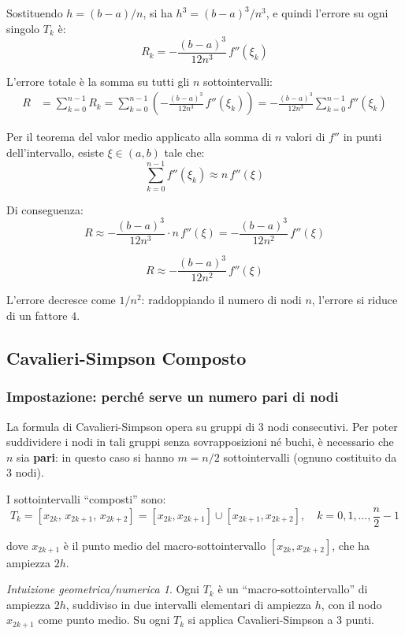 \documentclass[a4paper,12pt]{article}
\theoremstyle{definition}
\theoremstyle{remark}
\newtheorem*{intuizione}{Intuizione geometrica/numerica}
\begin{document}
\noindent Sostituendo $h = (b-a)/n$, si ha $h^3 = (b-a)^3/n^3$, e quindi
l'errore su ogni singolo $T_k$ è:
\[
  R_k = -\frac{(b-a)^3}{12n^3}\,f''(\xi_k)
\]

L'errore totale è la somma su tutti gli $n$ sottointervalli:
\begin{align*}
  R &= \sum_{k=0}^{n-1} R_k
     = \sum_{k=0}^{n-1} \left(-\frac{(b-a)^3}{12n^3}\,f''(\xi_k)\right)
     = -\frac{(b-a)^3}{12n^3}\sum_{k=0}^{n-1} f''(\xi_k)
\end{align*}

\noindent Per il teorema del valor medio applicato alla somma di $n$
valori di $f''$ in punti dell'intervallo, esiste $\xi \in (a,b)$ tale che:
\[
  \sum_{k=0}^{n-1} f''(\xi_k) \approx n\,f''(\xi)
\]

\noindent Di conseguenza:
\[
  R \approx -\frac{(b-a)^3}{12n^3} \cdot n\,f''(\xi) = -\frac{(b-a)^3}{12n^2}\,f''(\xi)
\]

\begin{equation}
  \boxed{R \approx -\frac{(b-a)^3}{12n^2}\,f''(\xi)}
  \label{eq:errore-trap-comp}
\end{equation}

\noindent L'errore decresce come $1/n^2$: raddoppiando il numero di nodi
$n$, l'errore si riduce di un fattore $4$.

\subsection{Cavalieri-Simpson Composto}

\subsubsection*{Impostazione: perché serve un numero pari di nodi}

La formula di Cavalieri-Simpson opera su gruppi di 3 nodi consecutivi.
Per poter suddividere i nodi in tali gruppi senza sovrapposizioni né
buchi, è necessario che $n$ sia \textbf{pari}: in questo caso si hanno
$m = n/2$ sottointervalli (ognuno costituito da 3 nodi).

I sottointervalli ``composti'' sono:
\[
  T_k = [x_{2k},\, x_{2k+1},\, x_{2k+2}]
      = [x_{2k},x_{2k+1}] \cup [x_{2k+1},x_{2k+2}],
      \quad k = 0, 1, \ldots, \frac{n}{2}-1
\]

\noindent dove $x_{2k+1}$ è il punto medio del macro-sottointervallo
$[x_{2k},x_{2k+2}]$, che ha ampiezza $2h$.

\begin{intuizione}
Ogni $T_k$ è un ``macro-sottointervallo'' di ampiezza $2h$, suddiviso
in due intervalli elementari di ampiezza $h$, con il nodo $x_{2k+1}$
come punto medio. Su ogni $T_k$ si applica Cavalieri-Simpson a 3 punti.
\end{intuizione}
\end{document}
